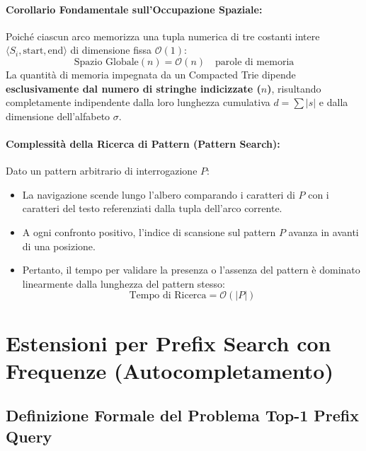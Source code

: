 \paragraph{Corollario Fondamentale sull'Occupazione Spaziale:}
Poich\'e ciascun arco memorizza una tupla numerica di tre costanti intere $\langle S_i, \text{start}, \text{end} \rangle$ di dimensione fissa $\mathcal{O}(1)$:
\begin{equation}
  \text{Spazio Globale}(n) = \mathcal{O}(n) \quad \text{parole di memoria}
\end{equation}
La quantit\`a di memoria impegnata da un Compacted Trie dipende \textbf{esclusivamente dal numero di stringhe indicizzate ($n$)}, risultando completamente indipendente dalla loro lunghezza cumulativa $d = \sum |s|$ e dalla dimensione dell'alfabeto $\sigma$.

\paragraph{Complessità della Ricerca di Pattern (Pattern Search):}
Dato un pattern arbitrario di interrogazione $P$:
\begin{itemize}
  \item La navigazione scende lungo l'albero comparando i caratteri di $P$ con i caratteri del testo referenziati dalla tupla dell'arco corrente.
  \item A ogni confronto positivo, l'indice di scansione sul pattern $P$ avanza in avanti di una posizione.
  \item Pertanto, il tempo per validare la presenza o l'assenza del pattern \`e dominato linearmente dalla lunghezza del pattern stesso:
  \begin{equation}
    \text{Tempo di Ricerca} = \mathcal{O}(|P|)
  \end{equation}
\end{itemize}

\FloatBarrier
\section{Estensioni per Prefix Search con Frequenze (Autocompletamento)}
\label{sec:autocompletamento-prefix-search}

\FloatBarrier
\subsection{Definizione Formale del Problema Top-1 Prefix Query}
\label{subsec:definizione-top1-prefix}

